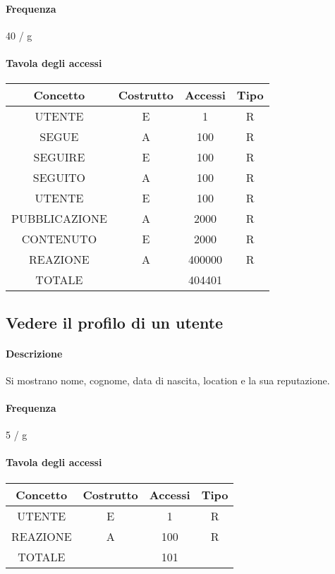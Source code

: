 \documentclass[a4paper,12pt]{report}
\begin{document}
\paragraph{Frequenza} 40 / g
\begin{table}[H]
\paragraph{Tavola degli accessi\newline}
\begin{tabular}{|c|c|c|c|}
\hline
Concetto      & Costrutto & Accessi & Tipo \\ \hline
UTENTE        & E         & 1       & R    \\ \hline
SEGUE         & A         & 100     & R    \\ \hline
SEGUIRE       & E         & 100     & R    \\ \hline
SEGUITO       & A         & 100     & R    \\ \hline
UTENTE        & E         & 100     & R    \\ \hline
PUBBLICAZIONE & A         & 2000    & R    \\ \hline
CONTENUTO     & E         & 2000    & R    \\ \hline
REAZIONE      & A         & 400000  & R    \\ \hline
TOTALE        &           & 404401  &      \\ \hline
\end{tabular}
\end{table}
\subsection{Vedere il profilo di un utente} \label{vedere_profilo}
\paragraph{Descrizione} Si mostrano nome, cognome, data di nascita, location e la sua reputazione.
\paragraph{Frequenza} 5 / g
\begin{table}[H]
\paragraph{Tavola degli accessi\newline}
\begin{tabular}{|c|c|c|c|}
\hline
Concetto & Costrutto & Accessi & Tipo \\ \hline
UTENTE   & E         & 1       & R    \\ \hline
REAZIONE & A         & 100     & R    \\ \hline
TOTALE   &           & 101     &      \\ \hline
\end{tabular}
\end{table}
\end{document}
